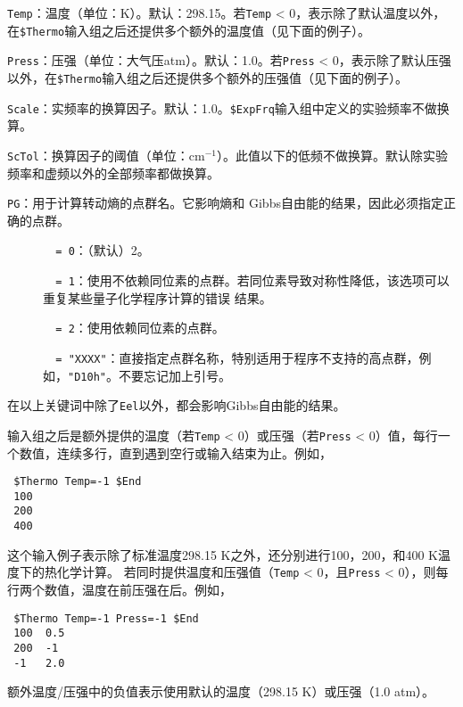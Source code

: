 \documentclass[12pt,a4paper,openany,twoside,cap,UTF8]{ctexbook}
\begin{document}
\bigskip{}\noindent
\verb|Temp|：温度（单位：K）。默认：298.15。若\verb|Temp| < 0，表示除了默认温度以外，在\texttt{\$Thermo}输入组之后还提供多个额外的温度值（见下面的例子）。

\bigskip{}\noindent
\verb|Press|：压强（单位：大气压atm）。默认：1.0。若\verb|Press| < 0，表示除了默认压强以外，在\texttt{\$Thermo}输入组之后还提供多个额外的压强值（见下面的例子）。

\bigskip{}\noindent
\verb|Scale|：实频率的换算因子。默认：1.0。\texttt{\$ExpFrq}输入组中定义的实验频率不做换算。

\bigskip{}\noindent
\verb|ScTol|：换算因子的阈值（单位：cm$^{-1}$）。此值以下的低频不做换算。默认除实验频率和虚频以外的全部频率都做换算。

\bigskip{}\noindent
\verb|PG|：用于计算转动熵的点群名。它影响熵和 Gibbs自由能的结果，因此必须指定正确的点群。
\begin{description}
\item[ ]\verb|  = 0|：（默认）2。
\item[ ]\verb|  = 1|：使用不依赖同位素的点群。若同位素导致对称性降低，该选项可以重复某些量子化学程序计算的错误 结果。
\item[ ]\verb|  = 2|：使用依赖同位素的点群。
\item[ ]\verb|  = "XXXX"|：直接指定点群名称，特别适用于程序不支持的高点群，例如，\verb|"D10h"|。不要忘记加上引号。
\end{description}

在以上关键词中除了\verb|Eel|以外，都会影响Gibbs自由能的结果。

输入组之后是额外提供的温度（若\verb|Temp| < 0）或压强（若\verb|Press| < 0）值，每行一个数值，连续多行，直到遇到空行或输入结束为止。例如，
\begin{colorboxed}[oval=false,boxcolor=blue!75!black,bgcolor=blue!5!white]
\ttfamily
\begin{lstlisting}
 $Thermo Temp=-1 $End
 100
 200
 400
\end{lstlisting}\end{colorboxed}
这个输入例子表示除了标准温度298.15 K之外，还分别进行100，200，和400 K温度下的热化学计算。
若同时提供温度和压强值（\verb|Temp| < 0，且\verb|Press| < 0），则每行两个数值，温度在前压强在后。例如，
\begin{colorboxed}[oval=false,boxcolor=blue!75!black,bgcolor=blue!5!white]
\ttfamily
\begin{lstlisting}
 $Thermo Temp=-1 Press=-1 $End
 100  0.5
 200  -1
 -1   2.0
\end{lstlisting}\end{colorboxed}
额外温度/压强中的负值表示使用默认的温度（298.15 K）或压强（1.0 atm）。
\end{document}
